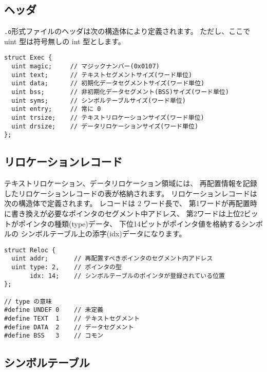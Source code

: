 \subsection{ヘッダ}

{\tt .o}形式ファイルのヘッダは次の構造体により定義されます。
ただし、ここで uint 型は符号無しの int 型とします。

\begin{mylist}
\begin{verbatim}
struct Exec {
  uint magic;     // マジックナンバー(0x0107)
  uint text;      // テキストセグメントサイズ(ワード単位)
  uint data;      // 初期化データセグメントサイズ(ワード単位)
  uint bss;       // 非初期化データセグメント(BSS)サイズ(ワード単位)
  uint syms;      // シンボルテーブルサイズ(ワード単位)
  uint entry;     // 常に 0
  uint trsize;    // テキストリロケーションサイズ(ワード単位)
  uint drsize;    // データリロケーションサイズ(ワード単位)
};
\end{verbatim}
\end{mylist}

\subsection{リロケーションレコード}

テキストリロケーション、データリロケーション領域には、
再配置情報を記録したリロケーションレコードの表が格納されます。
リロケーションレコードは次の構造体で定義されます。
レコードは 2 ワード長で、
第1ワードが再配置時に書き換えが必要なポインタのセグメント中アドレス、
第2ワードは上位2ビットがポインタの種類(type)データ、
下位14ビットがポインタ値を格納するシンボルの
シンボルテーブル上の添字(idx)データになります。

\begin{mylist}
\begin{verbatim}
struct Reloc {
  uint addr;       // 再配置すべきポインタのセグメント内アドレス
  uint type: 2,    // ポインタの型
       idx: 14;    // シンボルテーブルのポインタが登録されている位置
};

// type の意味
#define UNDEF 0    // 未定義
#define TEXT  1    // テキストセグメント
#define DATA  2    // データセグメント
#define BSS   3    // コモン
\end{verbatim}
\end{mylist}

\subsection{シンボルテーブル}

